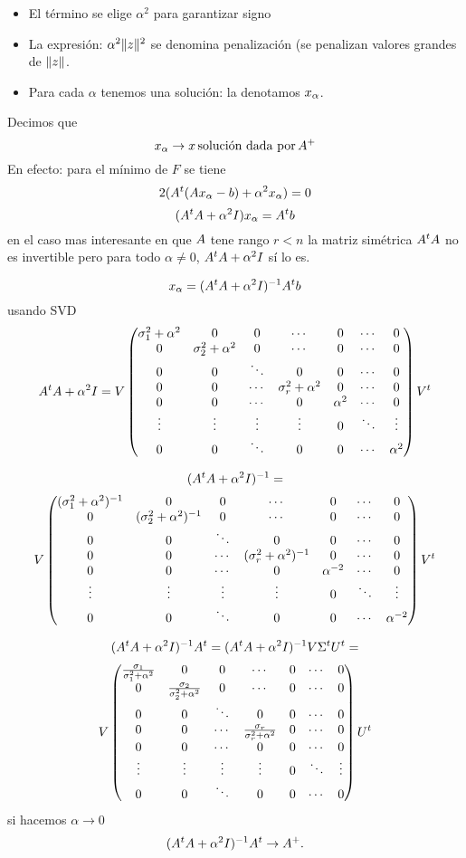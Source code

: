  \begin{itemize}
 \item  El término se elige $\alpha^2$ para garantizar signo
\item La expresión: $\alpha^2\|\zb\|^2$ se denomina penalización (se penalizan valores grandes de  $\|\zb\|$.
\item Para cada $\alpha$ tenemos una solución: la denotamos $\xb_\alpha$.
 \end{itemize}
 Decimos que 
 $$
 \xb_\alpha\to \xb \, \mbox{solución dada por}\, \Ab^+
 $$
 En efecto: para el mínimo de $F$ se tiene 
 $$
 2(\Ab^t(\Ab\xb_\alpha-\bb)+\alpha^2\xb_\alpha)=\cero
 $$
 $$
 (\Ab^t\Ab+\alpha^2 \Ib) \xb_\alpha=\Ab^t\bb
 $$
 en el caso mas interesante en que $\Ab$ tene rango $r<n$ la matriz simétrica $\Ab^t\Ab$
 no es invertible pero para todo $\alpha\neq 0$, $\Ab^t\Ab+\alpha^2 \Ib$ sí lo es.
 
 $$
 \xb_\alpha= (\Ab^t\Ab+\alpha^2 \Ib)^{-1}\Ab^t\bb
 $$
usando SVD
$$
\Ab^t\Ab+\alpha^2 \Ib=\Vb \begin{pmatrix}
\sigma_1^2+\alpha^2&0&0&\cdots &0&\cdots &0\\
0&\sigma_2^2+\alpha^2&0&\cdots &0&\cdots &0\\
0&0&\ddots&0&0&\cdots &0\\
0&0&\cdots&\sigma_r^2+\alpha^2&0&\cdots &0\\
0&0&\cdots&0&\alpha^2&\cdots &0\\
\vdots&\vdots&\vdots&\vdots&0&\ddots&\vdots\\
0&0&\ddots&0&0&\cdots &\alpha^2
\end{pmatrix} \Vb^t
$$

$$
(\Ab^t\Ab+\alpha^2 \Ib)^{-1}=$$
$$\Vb \begin{pmatrix}
(\sigma_1^2+\alpha^2)^{-1}&0&0&\cdots &0&\cdots &0\\
0&(\sigma_2^2+\alpha^2)^{-1}&0&\cdots &0&\cdots &0\\
0&0&\ddots&0&0&\cdots &0\\
0&0&\cdots&(\sigma_r^2+\alpha^2)^{-1}&0&\cdots &0\\
0&0&\cdots&0&\alpha^{-2}&\cdots &0\\
\vdots&\vdots&\vdots&\vdots&0&\ddots&\vdots\\
0&0&\ddots&0&0&\cdots &\alpha^{-2}
\end{pmatrix} \Vb^t
$$


$$
(\Ab^t\Ab+\alpha^2 \Ib)^{-1}\Ab^t=(\Ab^t\Ab+\alpha^2 \Ib)^{-1}\Vb\Sigma^t\Ub^t=
$$ 
$$\Vb \begin{pmatrix}
\frac{\sigma_1}{\sigma_1^2+\alpha^2}&0&0&\cdots &0&\cdots &0\\
0&\frac{\sigma_2}{\sigma_2^2+\alpha^2}&0&\cdots &0&\cdots &0\\
0&0&\ddots&0&0&\cdots &0\\
0&0&\cdots&\frac{\sigma_r}{\sigma_r^2+\alpha^2}&0&\cdots &0\\
0&0&\cdots&0&0&\cdots &0\\
\vdots&\vdots&\vdots&\vdots&0&\ddots&\vdots\\
0&0&\ddots&0&0&\cdots &0
\end{pmatrix} \Ub^t
$$
 si hacemos $\alpha\to 0$
 $$
 (\Ab^t\Ab+\alpha^2 \Ib)^{-1}\Ab^t \to \Ab^+.
 $$





